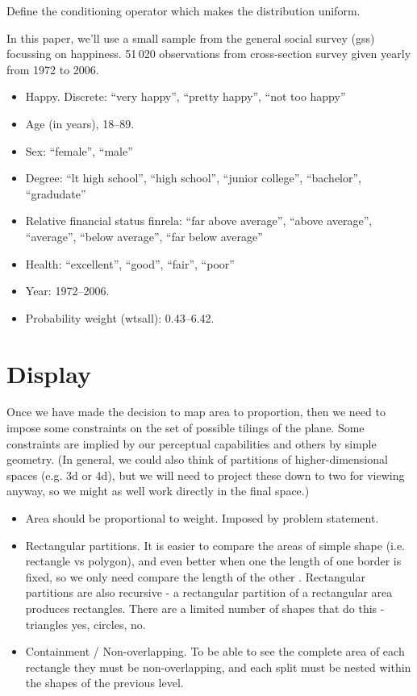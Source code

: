 \documentclass[letterpaper,oneside]{scrartcl}
\begin{document}
Define the conditioning operator which makes the distribution uniform.  

In this paper, we'll use a small sample from the general social survey ({\sc gss}) focussing on happiness. 51\,020 observations from cross-section survey given yearly from 1972 to 2006.

\begin{itemize}
  \item Happy.  Discrete: ``very happy'', ``pretty happy'', ``not too happy''
  \item Age (in years), 18--89.
  \item Sex: ``female'', ``male''
  \item Degree: ``lt high school'', ``high school'', ``junior college'', ``bachelor'', ``gradudate''
  \item Relative financial status {\sf finrela}: ``far above average'', ``above average'', ``average'', ``below average'', ``far below average''
  \item Health: ``excellent'', ``good'', ``fair'', ``poor''
  \item Year: 1972--2006.
  \item Probability weight ({\sf wtsall}): 0.43--6.42.
\end{itemize}


\section{Display}
\label{sec:display}

Once we have made the decision to map area to proportion, then we need to impose some constraints on the set of possible tilings of the plane.  Some constraints are implied by our perceptual capabilities and others by simple geometry. (In general, we could also think of partitions of higher-dimensional spaces (e.g. 3d or 4d), but we will need to project these down to two for viewing anyway, so we might as well work directly in the final space.)

\begin{itemize}
  \item Area should be proportional to weight.  Imposed by problem statement.

  \item Rectangular partitions. It is easier to compare the areas of simple shape (i.e. rectangle vs polygon), and even better when one the length of one border is fixed, so we only need compare the length of the other \citep{cleveland:1984}.  Rectangular partitions are also recursive - a rectangular partition of a rectangular area produces rectangles.  There are a limited number of shapes that do this - triangles yes, circles, no.

  \item Containment / Non-overlapping.  To be able to see the complete area of each rectangle they must be non-overlapping, and each split must be nested within the shapes of the previous level.
  
\end{itemize}
\end{document}
